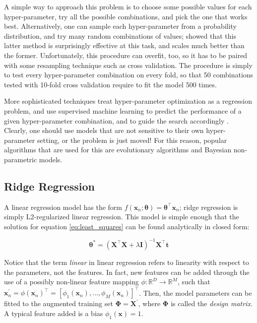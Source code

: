 \documentclass[12pt]{book}
\begin{document}
A simple way to approach this problem is to choose some possible values for each hyper-parameter, try all the possible combinations, and pick the one that works best. Alternatively, one can sample each hyper-parameter from a probability distribution, and try many random combinations of values; \cite{random_search} showed that this latter method is surprisingly effective at this task, and scales much better than the former. Unfortunately, this procedure can overfit, too, so it has to be paired with some resampling technique such as cross validation. The procedure is simply to test every hyper-parameter combination on every fold, so that 50 combinations tested with 10-fold cross validation require to fit the model 500 times.

More sophisticated techniques treat hyper-parameter optimization as a regression problem, and use supervised machine learning to predict the performance of a given hyper-parameter combination, and to guide the search accordingly \citep{hyperopt}. Clearly, one should use models that are not sensitive to their own hyper-parameter setting, or the problem is just moved! For this reason, popular algorithms that are used for this are evolutionary algorithms and Bayesian non-parametric models.

\subsection{Ridge Regression}
\label{sec:ridge}
A linear regression model has the form $f(\bm x_n;\bm\theta)=\bm\theta^\intercal\bm x_n$; ridge regression is simply L2-regularized linear regression. This model is simple enough that the solution for equation \ref{eq:least_squares} can be found analytically in closed form:

\begin{equation}
\label{eq:ridge_solution}
\bm\theta^*=(\bm X^\intercal\bm X+\lambda\bm I)^{-1}\bm X^\intercal\bm t
\end{equation}

Notice that the term \emph{linear} in linear regression refers to linearity with respect to the parameters, not the features. In fact, new features can be added through the use of a possibly non-linear feature mapping $\phi:\mathbb{R}^D\rightarrow\mathbb{R}^M$, such that $\bm x^\prime_n=\phi(\bm x_n)^\intercal=\left[\phi_1(\bm x_n),\ldots,\phi_M(\bm x_n)\right]^\intercal$. Then, the model parameters can be fitted to the augmented training set $\bm\Phi=\bm X^\prime$, where $\bm\Phi$ is called the \emph{design matrix}. A typical feature added is a bias $\phi_1(\bm x)=1$.
\end{document}
